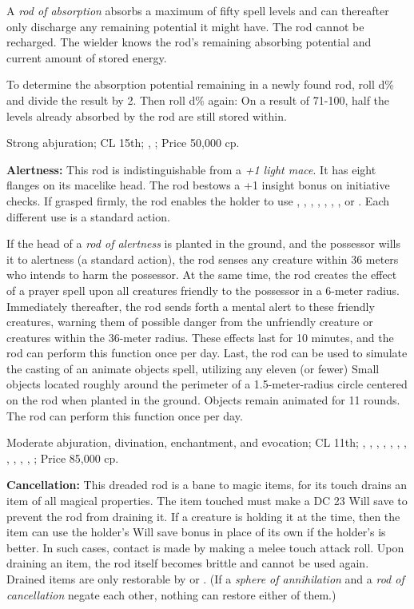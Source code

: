 A \emph{rod of absorption} absorbs a maximum of fifty spell levels and can thereafter only discharge any remaining potential it might have. The rod cannot be recharged. The wielder knows the rod's remaining absorbing potential and current amount of stored energy.

To determine the absorption potential remaining in a newly found rod, roll d\% and divide the result by 2. Then roll d\% again: On a result of 71-100, half the levels already absorbed by the rod are still stored within.

Strong abjuration; CL 15th; , ; Price 50,000 cp.

\textbf{Alertness:} This rod is indistinguishable from a \emph{+1 light mace}. It has eight flanges on its macelike head. The rod bestows a +1 insight bonus on initiative checks. If grasped firmly, the rod enables the holder to use , , , , , , , or . Each different use is a standard action.

If the head of a \emph{rod of alertness} is planted in the ground, and the possessor wills it to alertness (a standard action), the rod senses any creature within 36 meters who intends to harm the possessor. At the same time, the rod creates the effect of a prayer spell upon all creatures friendly to the possessor in a 6-meter radius. Immediately thereafter, the rod sends forth a mental alert to these friendly creatures, warning them of possible danger from the unfriendly creature or creatures within the 36-meter radius. These effects last for 10 minutes, and the rod can perform this function once per day. Last, the rod can be used to simulate the casting of an animate objects spell, utilizing any eleven (or fewer) Small objects located roughly around the perimeter of a 1.5-meter-radius circle centered on the rod when planted in the ground. Objects remain animated for 11 rounds. The rod can perform this function once per day.

Moderate abjuration, divination, enchantment, and evocation; CL 11th; , , , , , , , , , , , ; Price 85,000 cp.

\textbf{Cancellation:} This dreaded rod is a bane to magic items, for its touch drains an item of all magical properties. The item touched must make a DC 23 Will save to prevent the rod from draining it. If a creature is holding it at the time, then the item can use the holder's Will save bonus in place of its own if the holder's is better. In such cases, contact is made by making a melee touch attack roll. Upon draining an item, the rod itself becomes brittle and cannot be used again. Drained items are only restorable by  or . (If a \emph{sphere of annihilation} and a \emph{rod of cancellation} negate each other, nothing can restore either of them.)

